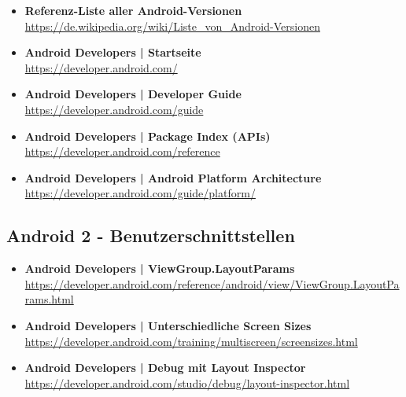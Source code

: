 \documentclass[a4paper]{article}
\begin{document}
{	\begin{itemize}
		\item \textbf{Referenz-Liste aller Android-Versionen}\\
		\href{https://de.wikipedia.org/wiki/Liste_von_Android-Versionen}
		{https://de.wikipedia.org/wiki/Liste\_von\_Android-Versionen}
		
		\item \textbf{Android Developers | Startseite}\\
		\href{https://developer.android.com/}
		{https://developer.android.com/}
		
		\item \textbf{Android Developers | Developer Guide}\\
		\href{https://developer.android.com/guide}
		{https://developer.android.com/guide}
		
		\item \textbf{Android Developers | Package Index (APIs)}\\
		\href{https://developer.android.com/reference
		}{https://developer.android.com/reference}
		
		\item \textbf{Android Developers | Android Platform Architecture}\\
		\href{https://developer.android.com/guide/platform/}
		{https://developer.android.com/guide/platform/}
	\end{itemize}
	
	\subsection{Android 2 - Benutzerschnittstellen}
	
	\begin{itemize}
		\item \textbf{Android Developers | ViewGroup.LayoutParams}\\
		\href{https://developer.android.com/reference/android/view/ViewGroup.LayoutParams.html}
		{https://developer.android.com/reference/android/view/ViewGroup.LayoutParams.html}
		
		\item \textbf{Android Developers | Unterschiedliche Screen Sizes}\\
		\href{https://developer.android.com/training/multiscreen/screensizes.html}
		{https://developer.android.com/training/multiscreen/screensizes.html}
		
		\item \textbf{Android Developers | Debug mit Layout Inspector}\\
		\href{https://developer.android.com/studio/debug/layout-inspector.html}
		{https://developer.android.com/studio/debug/layout-inspector.html}
		

\end{itemize}}
\end{document}

